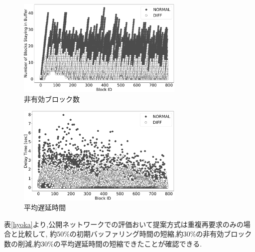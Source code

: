 \documentclass{ltjsarticle}
\begin{document}
\begin{figure}[h]
	\centering
	\includegraphics[width=8cm]{figure/testNSB.pdf}
	\vspace{-4.5mm}
	\caption{非有効ブロック数}
	\label{testnsb}
\end{figure}
\vspace{-4.5mm}

\vspace{-4mm}
\begin{figure}[h]
	\centering
	\includegraphics[width=8cm]{figure/testADT.pdf}
	\vspace{-4.5mm}
	\caption{平均遅延時間}
	\label{testadt}
\end{figure}
\vspace{-4.5mm}

\hspace{-3.5mm}表\ref{hyoka}より,公開ネットワークでの評価おいて提案方式は重複再要求のみの場合と比較して,
約50\%の初期バッファリング時間の短縮,約30\%の非有効ブロック数の削減,約30\%の平均遅延時間の短縮できたことが確認できる.
\vspace{-8mm}
\end{document}
